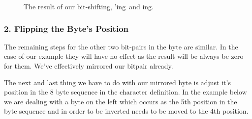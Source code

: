 \begin{figure}[H]
  {
    \setlength{\tabcolsep}{3.0pt}
    \setlength\cmidrulewidth{\lightrulewidth} %
    \begin{adjustbox}{width=10cm,center}
    \end{adjustbox}
  }\caption{The result of our bit-shifting, 'ing\, and ing.}
\end{figure}

\subsubsection{2. Flipping the Byte's Position}
The remaining steps for the other two bit-pairs in the byte are similar. In the case of our
example they will have no effect as the result will be always be zero for them. We've
effectively mirrored our bitpair already.

The next and last thing we have to do with our mirrored byte is adjust it's position in the 8 byte sequence
in the character definition. In the example below we are dealing with a byte on
the left which occurs as the 5th position in the byte sequence and in order to be
inverted needs to be moved to the 4th position.

